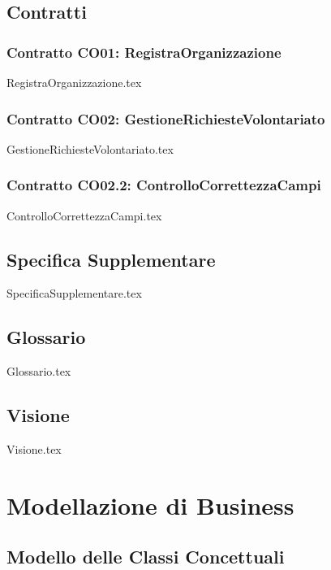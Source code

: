 \documentclass[12pt]{article}
\begin{document}
\subsection{Contratti}
\subsubsection{Contratto CO01: RegistraOrganizzazione}
{RegistraOrganizzazione.tex}

\subsubsection{Contratto CO02: GestioneRichiesteVolontariato}
{GestioneRichiesteVolontariato.tex}

\subsubsection{Contratto CO02.2: ControlloCorrettezzaCampi}
{ControlloCorrettezzaCampi.tex}

\subsection{Specifica Supplementare}
{SpecificaSupplementare.tex}

\subsection{Glossario}
{Glossario.tex}

\subsection{Visione}
{Visione.tex}

\section{Modellazione di Business}
\subsection{Modello delle Classi Concettuali}
\end{document}
